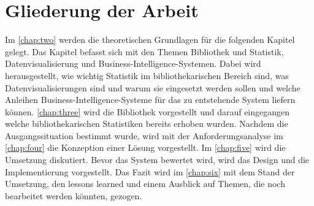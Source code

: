 \section{Gliederung der Arbeit}
Im \autoref{chap:two} werden die theoretischen Grundlagen für die folgenden Kapitel gelegt. Das Kapitel befasst
sich mit den Themen Bibliothek und Statistik, Datenvisualisierung und Business-Intelligence-Systemen. Dabei wird herausgestellt, wie wichtig Statistik
im bibliothekarischen Bereich sind, was Datenvisualisierungen sind und warum sie eingesetzt werden sollen und welche Anleihen Business-Intelligence-Systeme 
für das zu entstehende System liefern können. \autoref{chap:three}
wird die Bibliothek vorgestellt und darauf eingegangen welche bibliothekarischen Statistiken bereits erhoben wurden.
Nachdem die Ausgangssituation bestimmt wurde, wird mit der Anforderungsanalyse im \autoref{chap:four} die Konzeption einer Lösung vorgestellt.
Im \autoref{chap:five} wird die Umsetzung diskutiert. Bevor das System bewertet wird, wird das Design und die Implementierung vorgestellt.
Das Fazit wird im \autoref{chap:six} mit dem Stand der Umsetzung, den lessons learned und einem Ausblick auf Themen, die noch bearbeitet werden könnten, gezogen.
